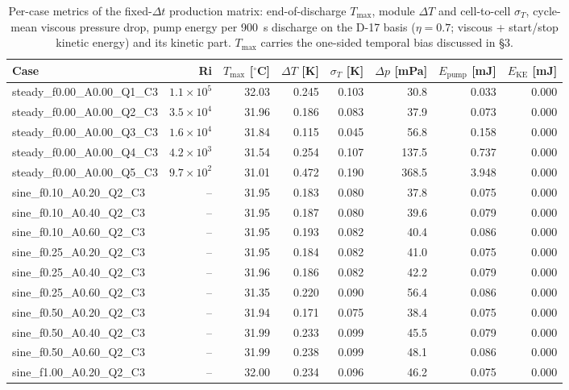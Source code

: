 \begin{table}[h]\centering\caption{Per-case metrics of the fixed-$\Delta t$ production matrix: end-of-discharge $T_\mathrm{max}$, module $\Delta T$ and cell-to-cell $\sigma_T$, cycle-mean viscous pressure drop, pump energy per 900~s discharge on the D-17 basis ($\eta=0.7$; viscous + start/stop kinetic energy) and its kinetic part. $T_\mathrm{max}$ carries the one-sided temporal bias discussed in \S3.}\label{tab:metrics}
\small\begin{tabular}{lrrrrrrr}\toprule
Case & Ri & $T_\mathrm{max}$ [$^\circ$C] & $\Delta T$ [K] & $\sigma_T$ [K] & $\Delta p$ [mPa] & $E_\mathrm{pump}$ [mJ] & $E_\mathrm{KE}$ [mJ] \\ \midrule
steady\_f0.00\_A0.00\_Q1\_C3 & $1.1\times10^{5}$ & 32.03 & 0.245 & 0.103 & 30.8 & 0.033 & 0.000 \\
steady\_f0.00\_A0.00\_Q2\_C3 & $3.5\times10^{4}$ & 31.96 & 0.186 & 0.083 & 37.9 & 0.073 & 0.000 \\
steady\_f0.00\_A0.00\_Q3\_C3 & $1.6\times10^{4}$ & 31.84 & 0.115 & 0.045 & 56.8 & 0.158 & 0.000 \\
steady\_f0.00\_A0.00\_Q4\_C3 & $4.2\times10^{3}$ & 31.54 & 0.254 & 0.107 & 137.5 & 0.737 & 0.000 \\
steady\_f0.00\_A0.00\_Q5\_C3 & $9.7\times10^{2}$ & 31.01 & 0.472 & 0.190 & 368.5 & 3.948 & 0.000 \\
sine\_f0.10\_A0.20\_Q2\_C3 & -- & 31.95 & 0.183 & 0.080 & 37.8 & 0.075 & 0.000 \\
sine\_f0.10\_A0.40\_Q2\_C3 & -- & 31.95 & 0.187 & 0.080 & 39.6 & 0.079 & 0.000 \\
sine\_f0.10\_A0.60\_Q2\_C3 & -- & 31.95 & 0.193 & 0.082 & 40.4 & 0.086 & 0.000 \\
sine\_f0.25\_A0.20\_Q2\_C3 & -- & 31.95 & 0.184 & 0.082 & 41.0 & 0.075 & 0.000 \\
sine\_f0.25\_A0.40\_Q2\_C3 & -- & 31.96 & 0.186 & 0.082 & 42.2 & 0.079 & 0.000 \\
sine\_f0.25\_A0.60\_Q2\_C3 & -- & 31.35 & 0.220 & 0.090 & 56.4 & 0.086 & 0.000 \\
sine\_f0.50\_A0.20\_Q2\_C3 & -- & 31.94 & 0.171 & 0.075 & 38.4 & 0.075 & 0.000 \\
sine\_f0.50\_A0.40\_Q2\_C3 & -- & 31.99 & 0.233 & 0.099 & 45.5 & 0.079 & 0.000 \\
sine\_f0.50\_A0.60\_Q2\_C3 & -- & 31.99 & 0.238 & 0.099 & 48.1 & 0.086 & 0.000 \\
sine\_f1.00\_A0.20\_Q2\_C3 & -- & 32.00 & 0.234 & 0.096 & 46.2 & 0.075 & 0.000 \\

\end{tabular}
\end{table}

